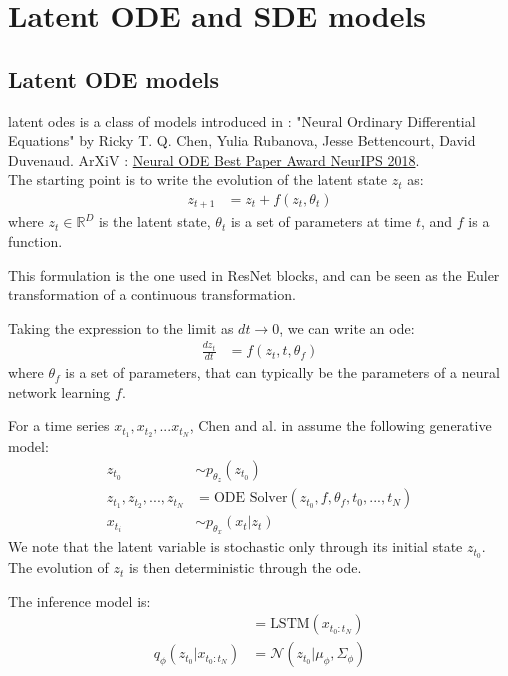 \chapter{Latent ODE and SDE models}\label{sec:Latent ODE and SDE models}

\section{Latent ODE models}

\glspl{latent ode} is a class of models introduced in \cite{chen_neural_2019} : "Neural Ordinary Differential Equations" 
by Ricky T. Q. Chen, Yulia Rubanova, Jesse Bettencourt, David Duvenaud. 
ArXiV : \href{https://arxiv.org/abs/1806.07366}{Neural ODE Best Paper Award NeurIPS 2018}.\\

The starting point is to write the evolution of the latent state $z_t$ as:
\begin{align}
    z_{t+1} &= z_t + f(z_t, \theta_t)
\end{align}
where $z_t \in \mathbb{R}^D$ is the latent state, $\theta_t$ is a set
 of parameters at time $t$, and $f$ is a function.

This formulation is the one used in ResNet blocks, and can be 
seen as the Euler transformation of a continuous transformation.

Taking the expression to the limit as $dt \rightarrow 0$, we can write an 
\gls{ode}:
\begin{align}
    \frac{dz_t}{dt} &= f(z_t, t, \theta_f)
\end{align}
where $\theta_f$ is a set of parameters, that can typically be the parameters of 
a neural network learning $f$.

For a time series $x_{t_1}, x_{t_2}, ... x_{t_N}$, Chen and al. in \cite{chen_neural_2019} 
assume the following generative model:
\begin{align}
    z_{t_0} &\sim p_{\theta_z}(z_{t_0}) \\
    z_{t_1}, z_{t_2}, ..., z_{t_N} &= \text{ODE Solver}(z_{t_0}, f, \theta_f, t_0, ..., t_N ) \\
    x_{t_i} &\sim p_{\theta_x}(x_t \vert z_t)
\end{align}
We note that the latent variable is stochastic only through its initial state $z_{t_0}$. 
The evolution of $z_t$ is then deterministic through the \gls{ode}.

The inference model is:
\begin{align}
    [\mu_\phi, \Sigma_\phi] &= \text{LSTM} (x_{t_0:t_N})   \\
    q_{\phi}(z_{t_0} \vert x_{t_0:t_N}) &= \mathcal{N}(z_{t_0} \vert \mu_{\phi}, \Sigma_\phi)
\end{align}

